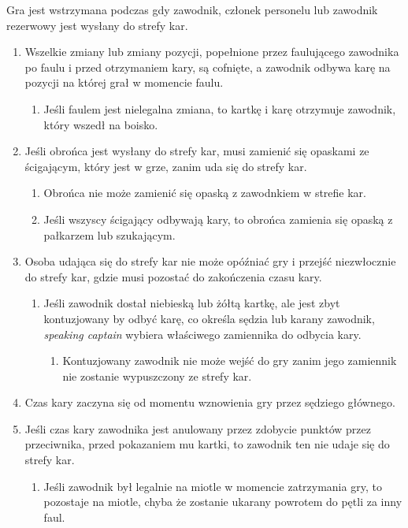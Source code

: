 \documentclass[11pt,a4paper]{article}
\renewcommand{\subsubsection}[1]{
  \oldsubsubsection{#1}%
  \label{\thesubsubsection}
}
\begin{document}
\subsubsection{Przejście do strefy kar}
Gra jest wstrzymana podczas gdy zawodnik, członek personelu lub zawodnik rezerwowy jest wysłany do strefy kar.
\begin{enumerate}
  \item Wszelkie zmiany lub zmiany pozycji, popełnione przez faulującego zawodnika po faulu i przed otrzymaniem kary, są cofnięte, a zawodnik odbywa karę na pozycji na której grał w momencie faulu.
  \begin{enumerate}
    \item Jeśli faulem jest nielegalna zmiana, to kartkę i karę otrzymuje zawodnik, który wszedł na boisko.
  \end{enumerate}
  \item Jeśli obrońca jest wysłany do strefy kar, musi zamienić się opaskami ze ścigającym, który jest w grze, zanim uda się do strefy kar.
  \begin{enumerate}
    \item Obrońca nie może zamienić się opaską z zawodnkiem w strefie kar.
    \item Jeśli wszyscy ścigający odbywają kary, to obrońca zamienia się opaską z pałkarzem lub szukającym.
  \end{enumerate}
  \item Osoba udająca się do strefy kar nie może opóźniać gry i przejść niezwłocznie do strefy kar, gdzie musi pozostać do zakończenia czasu kary.
  \begin{enumerate}
    \item Jeśli zawodnik dostał niebieską lub żółtą kartkę, ale jest zbyt kontuzjowany by odbyć karę, co określa sędzia lub karany zawodnik, \emph{speaking captain} wybiera właściwego zamiennika do odbycia kary.
    \begin{enumerate}
      \item Kontuzjowany zawodnik nie może wejść do gry zanim jego zamiennik nie zostanie wypuszczony ze strefy kar.
    \end{enumerate}
  \end{enumerate}
  \item Czas kary zaczyna się od momentu wznowienia gry przez sędziego głównego.
  \item Jeśli czas kary zawodnika jest anulowany przez zdobycie punktów przez przeciwnika, przed pokazaniem mu kartki, to zawodnik ten nie udaje się do strefy kar.
  \begin{enumerate}
    \item Jeśli zawodnik był legalnie na miotle w momencie zatrzymania gry, to pozostaje na miotle, chyba że zostanie ukarany powrotem do pętli za inny faul.
  \end{enumerate}
\end{enumerate}
\end{document}
